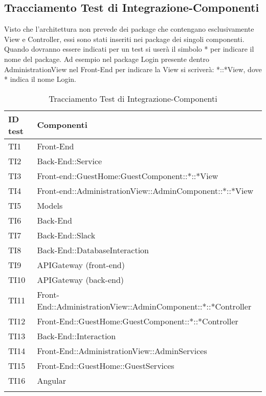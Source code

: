 \documentclass[../PianoDiQualifica.tex]{subfiles}
\begin{document}
	\newpage
	\subsection{Tracciamento Test di Integrazione-Componenti}
	Visto che l'architettura non prevede dei package che contengano esclusivamente View e Controller, essi sono stati inseriti nei package dei singoli componenti. Quando dovranno essere indicati per un test si userà il simbolo * per indicare il nome del package. Ad esempio nel package Login presente dentro AdministrationView nel Front-End per indicare la View si scriverà: *::*View, dove * indica il nome Login.
	\begin{longtable}[c] { >{\centering\arraybackslash}p{2cm} >{\centering\arraybackslash}p{11cm}}
		\toprule
		\centerline{\textbf{ID test}} & \centerline{\textbf{Componenti}} \\
			\midrule
			TI1 & Front-End \\
			\addlinespace[0.3em]
			\midrule
			\addlinespace[0.3em]
			TI2 & Back-End::Service \\
			\addlinespace[0.3em]
			\midrule
			\addlinespace[0.3em]
			TI3 & Front-end::GuestHome:GuestComponent::*::*View \\
			\addlinespace[0.3em]
			\midrule
			\addlinespace[0.3em]
			TI4 & Front-end::AdministrationView::AdminComponent::*::*View \\
			\addlinespace[0.3em]
			\midrule
			\addlinespace[0.3em]
			TI5 & Models \\
			\addlinespace[0.3em]
			\midrule
			\addlinespace[0.3em]
			TI6 & Back-End \\
			\addlinespace[0.3em]
			\midrule
			\addlinespace[0.3em]
			TI7 & Back-End::Slack \\
			\addlinespace[0.3em]
			\midrule
			\addlinespace[0.3em]
			TI8 & Back-End::DatabaseInteraction \\
			\addlinespace[0.3em]
			\midrule
			\addlinespace[0.3em]
			TI9 & APIGateway (front-end)\\
			\addlinespace[0.3em]
			\midrule
			\addlinespace[0.3em]	
			TI10 & APIGateway (back-end) \\
			\addlinespace[0.3em]
			\midrule
			\addlinespace[0.3em]
			TI11 &  Front-End::AdministrationView::AdminComponent::*::*Controller \\
			\addlinespace[0.3em]
			\midrule
			\addlinespace[0.3em]
			TI12 & Front-End::GuestHome:GuestComponent::*::*Controller \\
			\addlinespace[0.3em]
			\midrule
			\addlinespace[0.3em]
			TI13 & Back-End::Interaction \\
			\addlinespace[0.3em]
			\midrule
			\addlinespace[0.3em]
			TI14 & Front-End::AdministrationView::AdminServices \\
			\addlinespace[0.3em]
			\midrule
			\addlinespace[0.3em]
			TI15 & Front-End::GuestHome::GuestServices \\
			\addlinespace[0.3em]
			\midrule
			\addlinespace[0.3em]
			TI16 & Angular \\
			\bottomrule
			\caption{Tracciamento Test di Integrazione-Componenti}
	\end{longtable}
\end{document}
